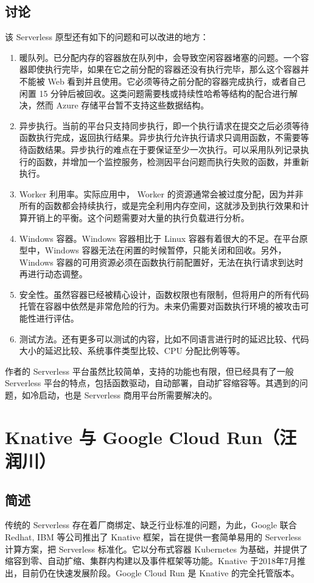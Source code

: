 \documentclass[11pt]{article}
\begin{document}
\subsection{讨论}
该 Serverless 原型还有如下的问题和可以改进的地方：
\begin{enumerate}
	\item 暖队列。已分配内存的容器放在队列中，会导致空闲容器堵塞的问题。一个容器即使执行完毕，如果在它之前分配的容器还没有执行完毕，那么这个容器并不能被 Web 看到并且使用。它必须等待之前分配的容器完成执行，或者自己闲置 15 分钟后被回收。这类问题需要栈或持续性哈希等结构的配合进行解决，然而 Azure 存储平台暂不支持这些数据结构。
	\item 异步执行。当前的平台只支持同步执行，即一个执行请求在提交之后必须等待函数执行完成，返回执行结果。异步执行允许执行请求只调用函数，不需要等待函数结果。异步执行的难点在于要保证至少一次执行。可以采用队列记录执行的函数，并增加一个监控服务，检测因平台问题而执行失败的函数，并重新执行。
	\item Worker 利用率。实际应用中， Worker 的资源通常会被过度分配，因为并非所有的函数都会持续执行，或是完全利用内存空间，这就涉及到执行效果和计算开销上的平衡。这个问题需要对大量的执行负载进行分析。
	\item Windows 容器。Windows 容器相比于 Linux 容器有着很大的不足。在平台原型中，Windows 容器无法在闲置的时候暂停，只能关闭和回收。另外，Windows 容器的可用资源必须在函数执行前配置好，无法在执行请求到达时再进行动态调整。
	\item 安全性。虽然容器已经被精心设计，函数权限也有限制，但将用户的所有代码托管在容器中依然是非常危险的行为。未来仍需要对函数执行环境的被攻击可能性进行评估。
	\item 测试方法。还有更多可以测试的内容，比如不同语言进行时的延迟比较、代码大小的延迟比较、系统事件类型比较、CPU 分配比例等等。
\end{enumerate}


作者的 Serverless 平台虽然比较简单，支持的功能也有限，但已经具有了一般 Serverless 平台的特点，包括函数驱动，自动部署，自动扩容缩容等。其遇到的问题，如冷启动，也是 Serverless 商用平台所需要解决的。

\section{Knative 与 Google Cloud Run（汪润川）}

\subsection{简述}
传统的 Serverless 存在着厂商绑定、缺乏行业标准的问题，为此，Google 联合 Redhat, IBM 等公司推出了 Knative 框架，旨在提供一套简单易用的 Serverless 计算方案，把 Serverless 标准化。它以分布式容器 Kubernetes 为基础，并提供了缩容到零、自动扩缩、集群内构建以及事件框架等功能。Knative 于2018年7月推出，目前仍在快速发展阶段。Google Cloud Run 是 Knative 的完全托管版本。
\end{document}
